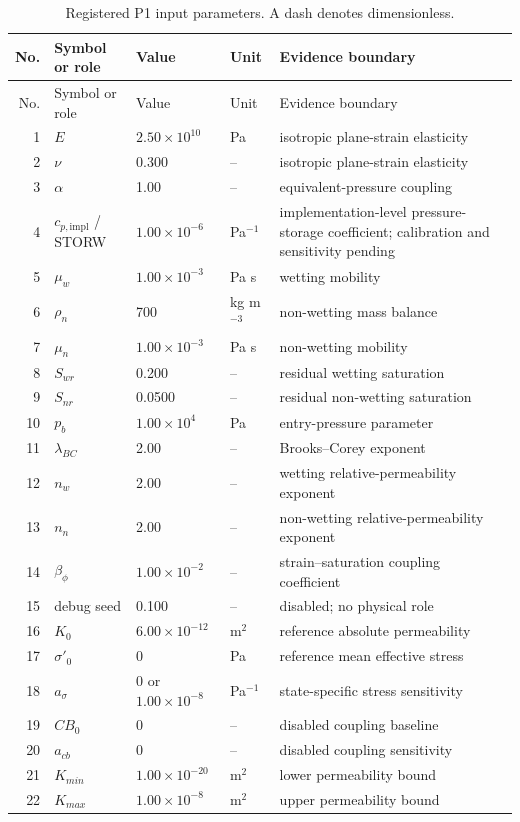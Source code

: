 \documentclass[preprint,12pt,authoryear]{elsarticle}
\begin{document}
\small
\begin{longtable}{@{}r p{} p{} p{} p{}@{}}
\caption{Registered P1 input parameters. A dash denotes dimensionless.}\label{tab:parameters}\\
\toprule
No. & Symbol or role & Value & Unit & Evidence boundary\\
\midrule
\endfirsthead
\toprule
No. & Symbol or role & Value & Unit & Evidence boundary\\
\midrule
\endhead
1 & $E$ & $2.50\times10^{10}$ & Pa & isotropic plane-strain elasticity\\
2 & $\nu$ & 0.300 & -- & isotropic plane-strain elasticity\\
3 & $\alpha$ & 1.00 & -- & equivalent-pressure coupling\\
4 & $c_{p,\mathrm{impl}}$ / STORW & $1.00\times10^{-6}$ & Pa$^{-1}$ & implementation-level pressure-storage coefficient; calibration and sensitivity pending\\
5 & $\mu_w$ & $1.00\times10^{-3}$ & Pa s & wetting mobility\\
6 & $\rho_n$ & 700 & kg m$^{-3}$ & non-wetting mass balance\\
7 & $\mu_n$ & $1.00\times10^{-3}$ & Pa s & non-wetting mobility\\
8 & $S_{wr}$ & 0.200 & -- & residual wetting saturation\\
9 & $S_{nr}$ & 0.0500 & -- & residual non-wetting saturation\\
10 & $p_b$ & $1.00\times10^{4}$ & Pa & entry-pressure parameter\\
11 & $\lambda_{BC}$ & 2.00 & -- & Brooks--Corey exponent\\
12 & $n_w$ & 2.00 & -- & wetting relative-permeability exponent\\
13 & $n_n$ & 2.00 & -- & non-wetting relative-permeability exponent\\
14 & $\beta_\phi$ & $1.00\times10^{-2}$ & -- & strain--saturation coupling coefficient\\
15 & debug seed & 0.100 & -- & disabled; no physical role\\
16 & $K_0$ & $6.00\times10^{-12}$ & m$^2$ & reference absolute permeability\\
17 & $\sigma'_0$ & 0 & Pa & reference mean effective stress\\
18 & $a_\sigma$ & 0 or $1.00\times10^{-8}$ & Pa$^{-1}$ & state-specific stress sensitivity\\
19 & $CB_0$ & 0 & -- & disabled coupling baseline\\
20 & $a_{cb}$ & 0 & -- & disabled coupling sensitivity\\
21 & $K_{min}$ & $1.00\times10^{-20}$ & m$^2$ & lower permeability bound\\
22 & $K_{max}$ & $1.00\times10^{-8}$ & m$^2$ & upper permeability bound\\
\bottomrule
\end{longtable}
\normalsize
\end{document}
